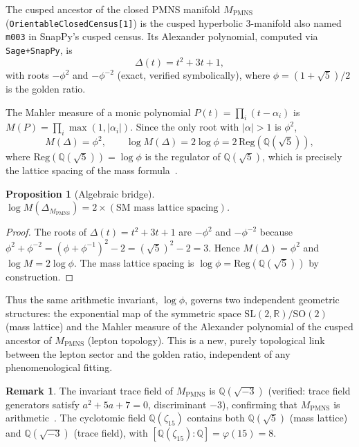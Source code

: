 \documentclass[12pt]{article}
\newtheorem{proposition}[theorem]{Proposition}
\theoremstyle{definition}
\newtheorem{remark}[theorem]{Remark}
\begin{document}
The cusped ancestor of the closed PMNS manifold $M_\text{PMNS}$
(\texttt{OrientableClosedCensus[1]}) is the cusped hyperbolic 3-manifold
also named \texttt{m003} in SnapPy's cusped census.  Its Alexander
polynomial, computed via \texttt{Sage+SnapPy}, is
\[
\Delta(t) = t^2 + 3t + 1,
\]
with roots $-\phi^2$ and $-\phi^{-2}$ (exact, verified symbolically),
where $\phi = (1+\sqrt5)/2$ is the golden ratio.

The Mahler measure of a monic polynomial $P(t)=\prod_i(t-\alpha_i)$ is
$M(P)=\prod_i\max(1,|\alpha_i|)$.  Since the only root with $|\alpha|>1$
is $\phi^2$,
\[
M(\Delta) = \phi^2, \qquad
\log M(\Delta) = 2\log\phi = 2\,\mathrm{Reg}(\mathbb{Q}(\sqrt{5})),
\]
where $\mathrm{Reg}(\mathbb{Q}(\sqrt{5}))=\log\phi$ is the regulator of
$\mathbb{Q}(\sqrt{5})$, which is precisely the lattice spacing of the
mass formula~\cite{Gentry:ShapeSpace}.

\begin{proposition}[Algebraic bridge]
\label{prop:mahler}
$\log M(\Delta_{M_\text{PMNS}}) = 2 \times (\text{SM mass lattice spacing})$.
\end{proposition}

\begin{proof}
The roots of $\Delta(t)=t^2+3t+1$ are $-\phi^2$ and $-\phi^{-2}$ because
$\phi^2+\phi^{-2}=(\phi+\phi^{-1})^2-2=(\sqrt{5})^2-2=3$.
Hence $M(\Delta)=\phi^2$ and $\log M = 2\log\phi$.  The mass lattice
spacing is $\log\phi = \mathrm{Reg}(\mathbb{Q}(\sqrt{5}))$ by construction.
\end{proof}

Thus the same arithmetic invariant, $\log\phi$, governs two independent
geometric structures: the exponential map of the symmetric space
$\mathrm{SL}(2,\mathbb{R})/\mathrm{SO}(2)$ (mass lattice) and the
Mahler measure of the Alexander polynomial of the cusped ancestor of
$M_\text{PMNS}$ (lepton topology).  This is a new, purely topological
link between the lepton sector and the golden ratio, independent of any
phenomenological fitting.

\begin{remark}
The invariant trace field of $M_\text{PMNS}$ is $\mathbb{Q}(\sqrt{-3})$
(verified: trace field generators satisfy $a^2+5a+7=0$, discriminant
$-3$), confirming that $M_\text{PMNS}$ is arithmetic~\cite{Chinburg98}.
The cyclotomic field $\mathbb{Q}(\zeta_{15})$ contains both
$\mathbb{Q}(\sqrt{5})$ (mass lattice) and $\mathbb{Q}(\sqrt{-3})$
(trace field), with $[\mathbb{Q}(\zeta_{15}):\mathbb{Q}]=\varphi(15)=8$.
\end{remark}
\end{document}
